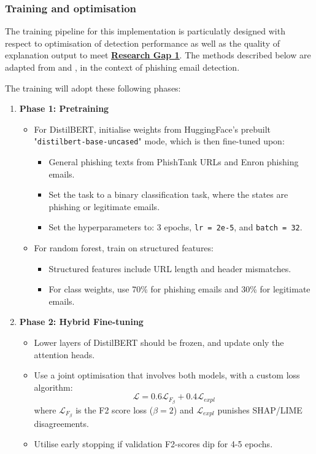 
\subsubsection*{Training and optimisation}
The training pipeline for this implementation is particulatly designed with respect to optimisation of detection performance as well as the quality of explanation output to meet \hyperref[research-gap-1]{\uline{\textbf{Research Gap 1}}}. The methods described below are adapted from \cite{do2024integrated} and \cite{shendkar2024enhancing}, in the context of phishing email detection.\newline

\noindent The training will adopt these following phases:

\begin{enumerate}
  \item \textbf{Phase 1: Pretraining}
  \begin{itemize}
    \item For DistilBERT, initialise weights from HuggingFace's prebuilt "\texttt{distilbert-base-uncased}" mode, which is then fine-tuned upon:
    \begin{itemize}
      \item General phishing texts from PhishTank URLs and Enron phishing emails.
      \item Set the task to a binary classification task, where the states are phishing or legitimate emails.
      \item Set the hyperparameters to: 3 epochs, \texttt{lr = 2e-5}, and \texttt{batch = 32}.
    \end{itemize}
    \item For random forest, train on structured features:
    \begin{itemize}
      \item Structured features include URL length and header mismatches.
      \item For class weights, use 70\% for phishing emails and 30\% for legitimate emails.
    \end{itemize}
  \end{itemize}
  \item \textbf{Phase 2: Hybrid Fine-tuning}
  \begin{itemize}
    \item Lower layers of DistilBERT should be frozen, and update only the attention heads.
    \item Use a joint optimisation that involves both models, with a custom loss algorithm:
    \begin{equation}
      \mathcal{L} = 0.6\mathcal{L}_{F_\beta} + 0.4\mathcal{L}_{expl}
    \end{equation}
    where $\mathcal{L}_{F_\beta}$ is the F2 score loss ($\beta=2$) and $\mathcal{L}_{expl}$ punishes SHAP/LIME disagreements.
    \item Utilise early stopping if validation F2-scores dip for 4-5 epochs.
  \end{itemize}
\end{enumerate}


